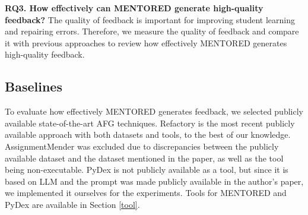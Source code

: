 \documentclass[10pt,conference]{IEEEtran}
\begin{document}
        \textbf{RQ3. How effectively can MENTORED generate high-quality feedback?}
        The quality of feedback is important for improving student learning and repairing errors. Therefore, we measure the quality of feedback and compare it with previous approaches to review how effectively MENTORED generates high-quality feedback.


    \subsection{Baselines}
        To evaluate how effectively MENTORED generates feedback, we selected publicly available state-of-the-art AFG techniques. Refactory \cite{hu2019re} is the most recent publicly available approach with both datasets and tools, to the best of our knowledge. AssignmentMender \cite{li2022generating} was excluded due to discrepancies between the publicly available dataset and the dataset mentioned in the paper, as well as the tool being non-executable. PyDex \cite{zhang2024pydex} is not publicly available as a tool, but since it is based on LLM and the prompt was made publicly available in the author's paper, we implemented it ourselves for the experiments. Tools for MENTORED and PyDex are available in Section \ref{tool}.
\end{document}

